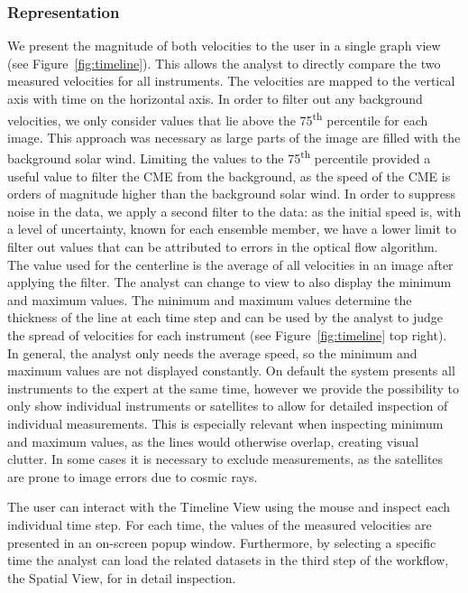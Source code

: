 \documentclass[journal]{vgtc}                %
\begin{document}
\subsubsection{Representation} \label{sec:representation}
We present the magnitude of both velocities to the user in a single graph view (see Figure~\ref{fig:timeline}). This allows the analyst to directly compare the two measured velocities for all instruments. The velocities are mapped to the vertical axis with time on the horizontal axis. In order to filter out any background velocities, we only consider values that lie above the 75\textsuperscript{th} percentile for each image. This approach was necessary as large parts of the image are filled with the background solar wind. Limiting the values to the 75\textsuperscript{th} percentile provided a useful value to filter the CME from the background, as the speed of the CME is orders of magnitude higher than the background solar wind. In order to suppress noise in the data, we apply a second filter to the data: as the initial speed is, with a level of uncertainty, known for each ensemble member, we have a lower limit to filter out values that can be attributed to errors in the optical flow algorithm. The value used for the centerline is the average of all velocities in an image after applying the filter. The analyst can change to view to also display the minimum and maximum values. The minimum and maximum values determine the thickness of the line at each time step and can be used by the analyst to judge the spread of velocities for each instrument (see Figure~\ref{fig:timeline} top right). In general, the analyst only needs the average speed, so the minimum and maximum values are not displayed constantly. On default the system presents all instruments to the expert at the same time, however we provide the possibility to only show individual instruments or satellites to allow for detailed inspection of individual measurements. This is especially relevant when inspecting minimum and maximum values, as the lines would otherwise overlap, creating visual clutter. In some cases it is necessary to exclude measurements, as the satellites are prone to image errors due to cosmic rays. 

The user can interact with the Timeline View using the mouse and inspect each individual time step. For each time, the values of the measured velocities are presented in an on-screen popup window. Furthermore, by selecting a specific time the analyst can load the related datasets in the third step of the workflow, the Spatial View, for in detail inspection.
\end{document}
